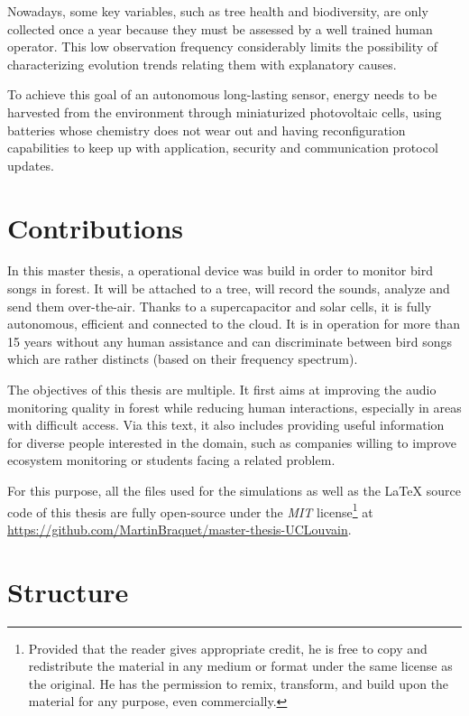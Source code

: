 \documentclass{EPL-master-thesis-covers-EN}
\begin{document}
Nowadays, some key variables, such as tree health and biodiversity, are only collected once a year because they must be assessed by a well trained human operator. This low observation frequency considerably limits the possibility of characterizing evolution trends relating them with explanatory causes. 

To achieve this goal of an autonomous long-lasting sensor, energy needs to be harvested from the environment through miniaturized photovoltaic cells, using batteries whose chemistry does not wear out and having reconfiguration capabilities to keep up with application, security and communication protocol updates.

\section*{Contributions}

In this master thesis, a operational device was build in order to monitor bird songs in forest. It will be attached to a tree, will record the sounds, analyze and send them over-the-air. Thanks to a supercapacitor and solar cells, it is fully autonomous, efficient and connected to the cloud. It is in operation for more than 15 years without any human assistance and can discriminate between bird songs which are rather distincts (based on their frequency spectrum).

The objectives of this thesis are multiple. It first aims at improving the audio monitoring quality in forest while reducing human interactions, especially in areas with difficult access. Via this text, it also includes providing useful information for diverse people interested in the domain, such as companies willing to improve ecosystem monitoring or students facing a related problem.

For this purpose, all the files used for the simulations as well as the LaTeX source code of this thesis are fully open-source under the \textit{MIT} license\footnote{Provided that the reader gives appropriate credit, he is free to copy and redistribute the material in any medium or format under the same license as the original. He has the permission to remix, transform, and build upon the material for any purpose, even commercially.} at \url{https://github.com/MartinBraquet/master-thesis-UCLouvain}.

\section*{Structure}
\end{document}
